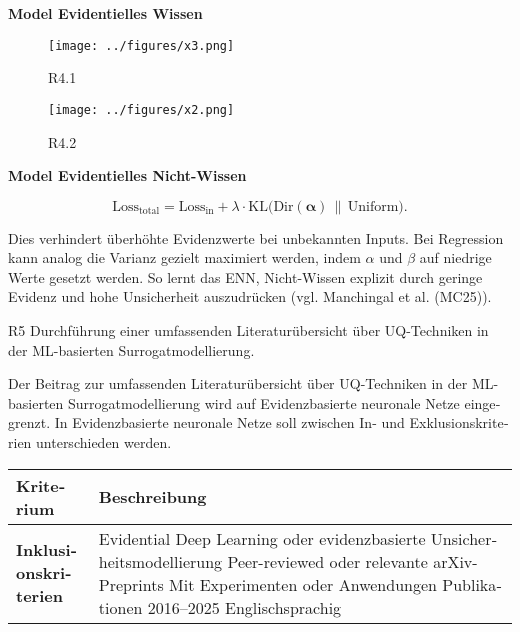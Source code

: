 \begin{otherlanguage}{ngerman}
\textbf{Model Evidentielles Wissen}

\begin{figure}[ht]
  \centering
  \texttt{[image: ../figures/x3.png]}
  \caption{R4.1}
\end{figure}

\begin{figure}[ht]
  \centering
  \texttt{[image: ../figures/x2.png]}
  \caption{R4.2}
\end{figure}


\textbf{Model Evidentielles Nicht-Wissen}

\[
\text{Loss}_{\text{total}} = \text{Loss}_{\text{in}} + \lambda \cdot \text{KL}\bigl(\text{Dir}(\boldsymbol{\alpha}) \,\|\, \text{Uniform}\bigr).
\]

Dies verhindert überhöhte Evidenzwerte bei unbekannten Inputs. Bei Regression kann analog die Varianz gezielt maximiert werden, indem $\alpha$ und $\beta$ auf niedrige Werte gesetzt werden. So lernt das ENN, Nicht-Wissen explizit durch geringe Evidenz und hohe Unsicherheit auszudrücken (vgl. Manchingal et al. (MC25)).



\pagebreak


R5 Durchführung einer umfassenden Literaturübersicht über UQ-Techniken in der ML-basierten Surrogatmodellierung.

Der Beitrag zur umfassenden Literaturübersicht über UQ-Techniken in der ML-basierten Surrogatmodellierung wird auf \gls{Evidenzbasierte neuronale Netze} eingegrenzt. In \gls{Evidenzbasierte neuronale Netze} soll zwischen In- und Exklusionskriterien unterschieden werden.

\begin{table}[htbp]
\centering
\footnotesize
\begin{tabularx}{\textwidth}{|l|X|}
\hline
\textbf{Kriterium} & \textbf{Beschreibung} \\ \hline

\textbf{Inklusionskriterien} & 
Evidential Deep Learning oder evidenzbasierte Unsicherheitsmodellierung \newline
Peer-reviewed oder relevante arXiv-Preprints \newline
Mit Experimenten oder Anwendungen \newline
Publikationen 2016–2025 \newline
Englischsprachig \\ \hline


\end{tabularx}
\end{table}
\end{otherlanguage}
